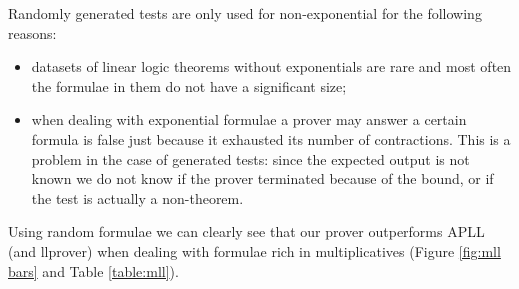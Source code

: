 Randomly generated tests are only used for non-exponential for the following reasons:
\begin{itemize}
	\item datasets of linear logic theorems without exponentials are rare and most often the formulae in them do not have a significant size; 
	\item when dealing with exponential formulae a prover may answer a certain formula is false just because it exhausted its number of contractions.
		This is a problem in the case of generated tests: since the expected output is not known we do not know if the prover terminated because of the bound, or if the test is actually a non-theorem.
\end{itemize}

Using random formulae we can clearly see that our prover outperforms APLL (and llprover) when dealing with formulae rich in multiplicatives (Figure \ref{fig:mll bars} and Table \ref{table:mll}).
